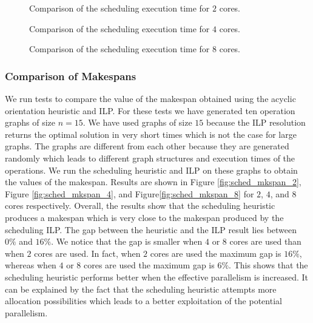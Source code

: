 \begin{figure}[phbt]
\centering

\caption{Comparison of the scheduling execution time for $2$ cores.}
\label{fig:sched_exec_2}
\end{figure}

\begin{figure}[phbt]
\centering

\caption{Comparison of the scheduling execution time for $4$ cores.}
\label{fig:sched_exec_4}
\end{figure}

\begin{figure}[phbt]
\centering

\caption{Comparison of the scheduling execution time for $8$ cores.}
\label{fig:sched_exec_8}
\end{figure}

\subsubsection{Comparison of Makespans}

We run tests to compare the value of the makespan obtained using the acyclic orientation heuristic and ILP. For these tests we have generated ten operation graphs of size $n = 15$. We have used graphs of size $15$ because the ILP resolution returns the optimal solution in very short times which is not the case for large graphs. The graphs are different from each other because they are generated randomly which leads to different graph structures and execution times of the operations. We run the scheduling heuristic and ILP on these graphs to obtain the values of the makespan. Results are shown in Figure \ref{fig:sched_mkspan_2}, Figure \ref{fig:sched_mkspan_4}, and Figure\ref{fig:sched_mkspan_8} for $2$, $4$, and $8$ cores respectively. Overall, the results show that the scheduling heuristic produces a makespan which is very close to the makespan produced by the scheduling ILP. The gap between the heuristic and the ILP result lies between $0\%$ and $16\%$. We notice that the gap is smaller when $4$ or $8$ cores are used than when $2$ cores are used. In fact, when $2$ cores are used the maximum gap is $16\%$, whereas when $4$ or $8$ cores are used the maximum gap is $6\%$. This shows that the scheduling heuristic performs better when the effective parallelism is increased. It can be explained by the fact that the scheduling heuristic attempts more allocation possibilities which leads to a better exploitation of the potential parallelism.

